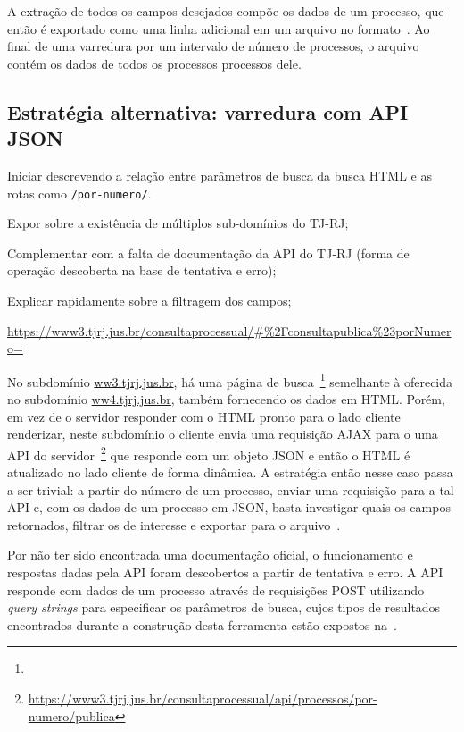 A extração de todos os campos desejados compõe os dados de um processo, que
então é exportado como uma linha adicional em um arquivo no
formato~\cite{spec:jsonlines}. Ao final de uma varredura por um intervalo de
número de processos, o arquivo contém os dados de todos os processos processos
dele.

\subsection{Estratégia alternativa: varredura com API JSON}

\begin{todolist}
    \item Iniciar descrevendo a relação entre parâmetros de busca da busca HTML
          e as rotas como \texttt{/por-numero/}.
    \item Expor sobre a existência de múltiplos sub-domínios do TJ-RJ;
    \item Complementar com a falta de documentação da API do TJ-RJ (forma de
          operação descoberta na base de tentativa e erro);
    \item Explicar rapidamente sobre a filtragem dos campos;
\end{todolist}

\urldef\urlConsultaJson\url{https://www3.tjrj.jus.br/consultaprocessual/#%2Fconsultapublica%23porNumero=}

No subdomínio \url{ww3.tjrj.jus.br}, há uma página de
busca~\footnote{\urlConsultaJson} semelhante à oferecida no subdomínio
\url{ww4.tjrj.jus.br}, também fornecendo os dados em HTML. Porém, em vez de o
servidor responder com o HTML pronto para o lado cliente renderizar, neste
subdomínio o cliente envia uma requisição AJAX para o uma API do
servidor~\footnote{\url{https://www3.tjrj.jus.br/consultaprocessual/api/processos/por-numero/publica}}
que responde com um objeto JSON e então o HTML é atualizado no lado cliente de
forma dinâmica. A estratégia então nesse caso passa a ser trivial: a partir do
número de um processo, enviar uma requisição para a tal API e, com os dados de
um processo em JSON, basta investigar quais os campos retornados, filtrar os de
interesse e exportar para o arquivo~\cite{spec:jsonlines}.

Por não ter sido encontrada uma documentação oficial, o funcionamento e
respostas dadas pela API foram descobertos a partir de tentativa e erro. A API
responde com dados de um processo através de requisições POST utilizando
\textit{query strings} para especificar os parâmetros de busca, cujos tipos de
resultados encontrados durante a construção desta ferramenta estão expostos
na~.

